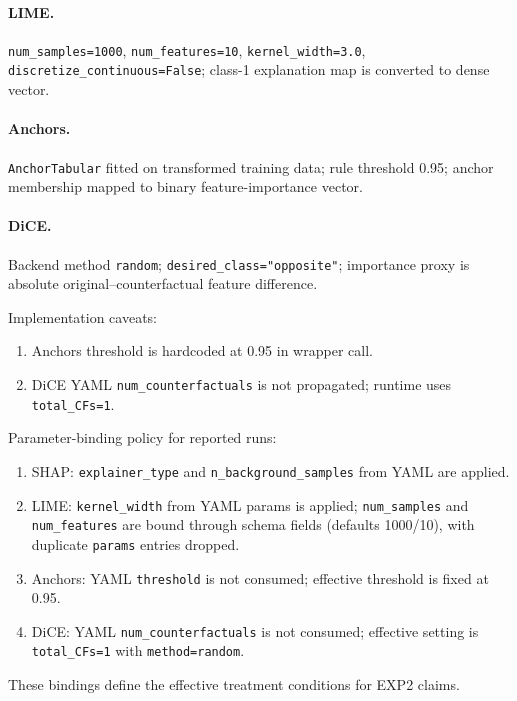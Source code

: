 \documentclass[twoside,11pt]{article}
\begin{document}
\paragraph{LIME.}
\texttt{num\_samples=1000}, \texttt{num\_features=10},
\texttt{kernel\_width=3.0}, \texttt{discretize\_continuous=False};
class-1 explanation map is converted to dense vector.

\paragraph{Anchors.}
\texttt{AnchorTabular} fitted on transformed training data; rule threshold 0.95;
anchor membership mapped to binary feature-importance vector.

\paragraph{DiCE.}
Backend method \texttt{random}; \texttt{desired\_class="opposite"};
importance proxy is absolute original--counterfactual feature difference.

Implementation caveats:
\begin{enumerate}[leftmargin=*]
    \item Anchors threshold is hardcoded at 0.95 in wrapper call.
    \item DiCE YAML \texttt{num\_counterfactuals} is not propagated; runtime uses
    \texttt{total\_CFs=1}.
\end{enumerate}
Parameter-binding policy for reported runs:
\begin{enumerate}[leftmargin=*]
    \item SHAP: \texttt{explainer\_type} and \texttt{n\_background\_samples} from YAML are applied.
    \item LIME: \texttt{kernel\_width} from YAML params is applied; \texttt{num\_samples} and \texttt{num\_features} are bound through schema fields (defaults 1000/10), with duplicate \texttt{params} entries dropped.
    \item Anchors: YAML \texttt{threshold} is not consumed; effective threshold is fixed at 0.95.
    \item DiCE: YAML \texttt{num\_counterfactuals} is not consumed; effective setting is \texttt{total\_CFs=1} with \texttt{method=random}.
\end{enumerate}
These bindings define the effective treatment conditions for EXP2 claims.
\end{document}
